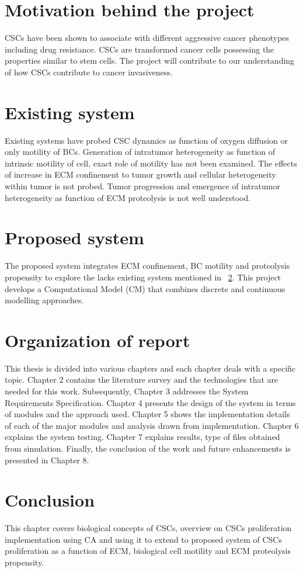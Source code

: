 \section{Motivation behind the project}
CSCs have been shown to associate with different aggressive cancer phenotypes including drug resistance.
CSCs are transformed cancer cells possessing the properties similar to stem cells. 
The project will contribute to our understanding of how CSCs contribute to cancer invasiveness.


\section{Existing system}
\label{ExistingSystem}
Existing systems have probed CSC dynamics as function of oxygen diffusion or only motility of BCs.
Generation of intratumor heterogeneity as function of intrinsic motility of cell, exact role of motility has not been examined.
The effects of increase in ECM confinement to tumor growth and cellular heterogeneity within tumor is not probed.
Tumor progression and emergence of intratumor heterogeneity as function of ECM proteolysis is not well understood.

\section{Proposed system}
The proposed system integrates ECM confinement, BC motility and proteolysis propensity to explore the lacks existing system mentioned in ~\ref{ExistingSystem}.
This project develops a Computational Model (CM) that combines discrete and continuous modelling approaches.

\section{Organization of report}
This thesis is divided into various chapters and each chapter deals with a specific topic.
Chapter 2 contains the literature survey and the technologies that are needed for this work.
Subsequently, Chapter 3 addresses the System Requirements Specification. 
Chapter 4 presents the design of the system in terms of modules and the approach used. 
Chapter 5 shows the implementation details of each of the major modules and analysis drawn from implementation. 
Chapter 6 explains the system testing.
Chapter 7 explains results, type of files obtained from simulation.
Finally, the conclusion of the work and future enhancements is presented in Chapter 8.

\section{Conclusion}
This chapter covers biological concepts of CSCs, 
overview on CSCs proliferation implementation using CA and using it to extend to proposed system of CSCs proliferation as a function of ECM, 
biological cell motility and 
ECM proteolysis propensity.

